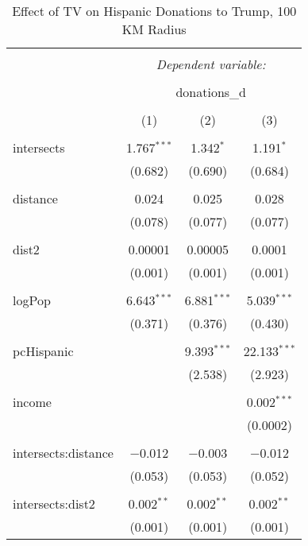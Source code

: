 
\begin{table}[!htbp] \centering 
  \caption{Effect of TV on Hispanic Donations to Trump, 100 KM Radius} 
  \label{} 
\begin{tabular}{@{\extracolsep{-5pt}}lccc} 
\\[-1.8ex]\hline 
\hline \\[-1.8ex] 
 & \multicolumn{3}{c}{\textit{Dependent variable:}} \\ 
\cline{2-4} 
\\[-1.8ex] & \multicolumn{3}{c}{donations\_d} \\ 
\\[-1.8ex] & (1) & (2) & (3)\\ 
\hline \\[-1.8ex] 
 intersects & 1.767$^{***}$ & 1.342$^{*}$ & 1.191$^{*}$ \\ 
  & (0.682) & (0.690) & (0.684) \\ 
  & & & \\ 
 distance & 0.024 & 0.025 & 0.028 \\ 
  & (0.078) & (0.077) & (0.077) \\ 
  & & & \\ 
 dist2 & 0.00001 & 0.00005 & 0.0001 \\ 
  & (0.001) & (0.001) & (0.001) \\ 
  & & & \\ 
 logPop & 6.643$^{***}$ & 6.881$^{***}$ & 5.039$^{***}$ \\ 
  & (0.371) & (0.376) & (0.430) \\ 
  & & & \\ 
 pcHispanic &  & 9.393$^{***}$ & 22.133$^{***}$ \\ 
  &  & (2.538) & (2.923) \\ 
  & & & \\ 
 income &  &  & 0.002$^{***}$ \\ 
  &  &  & (0.0002) \\ 
  & & & \\ 
 intersects:distance & $-$0.012 & $-$0.003 & $-$0.012 \\ 
  & (0.053) & (0.053) & (0.052) \\ 
  & & & \\ 
 intersects:dist2 & 0.002$^{**}$ & 0.002$^{**}$ & 0.002$^{**}$ \\ 
  & (0.001) & (0.001) & (0.001) \\ 

\end{tabular}
\end{table}
